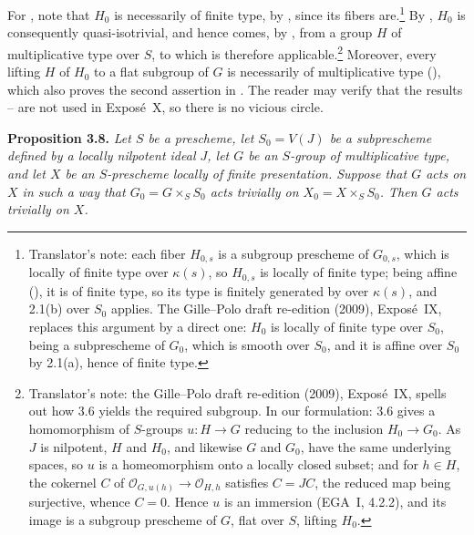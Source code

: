 For , note that \(H_0\) is
necessarily of finite type, by , since its fibers are.\footnote{Translator's note: each fiber \(H_{0,s}\) is a subgroup prescheme of \(G_{0,s}\), which is locally of finite type over \(\kappa(s)\), so \(H_{0,s}\) is locally of finite type; being affine (), it is of finite type, so its type is finitely generated by  over \(\kappa(s)\), and 2.1(b) over \(S_0\) applies. The Gille--Polo draft re-edition (2009), Expos\'e~IX, replaces this argument by a direct one: \(H_0\) is locally of finite type over \(S_0\), being a subprescheme of \(G_0\), which is smooth over \(S_0\), and it is affine over \(S_0\) by 2.1(a), hence of finite type.} By , \(H_0\) is consequently
quasi-isotrivial, and hence comes, by , from a group \(H\) of
multiplicative type over \(S\), to which  is therefore
applicable.\footnote{Translator's note: the Gille--Polo draft re-edition (2009), Expos\'e~IX, spells out how 3.6 yields the required subgroup. In our formulation: 3.6 gives a homomorphism of \(S\)-groups \(u:H\to G\) reducing to the inclusion \(H_0\to G_0\). As \(J\) is nilpotent, \(H\) and \(H_0\), and likewise \(G\) and \(G_0\), have the same underlying spaces, so \(u\) is a homeomorphism onto a locally closed subset; and for \(h\in H\), the cokernel \(C\) of \(\mathscr O_{G,u(h)}\to\mathscr O_{H,h}\) satisfies \(C=JC\), the reduced map being surjective, whence \(C=0\). Hence \(u\) is an immersion (EGA~I, 4.2.2), and its image is a subgroup prescheme of \(G\), flat over \(S\), lifting \(H_0\).}
Moreover, every lifting \(H\) of \(H_0\) to a flat subgroup of \(G\) is
necessarily of multiplicative type (), which
also proves the second assertion in
. The reader may verify that
the results --%
 are not used in
Expos\'e~X,
so there is no vicious circle.

\medskip
\noindent{}\textbf{Proposition 3.8.}
\textit{Let \(S\) be a prescheme, let \(S_0=V(J)\) be a subprescheme
defined by a locally nilpotent ideal \(J\), let \(G\) be an \(S\)-group
of multiplicative type, and let \(X\) be an \(S\)-prescheme locally of
finite presentation. Suppose that \(G\) acts on \(X\) in such a way that
\(G_0=G\times_SS_0\) acts trivially on \(X_0=X\times_SS_0\). Then \(G\)
acts trivially on \(X\).}

